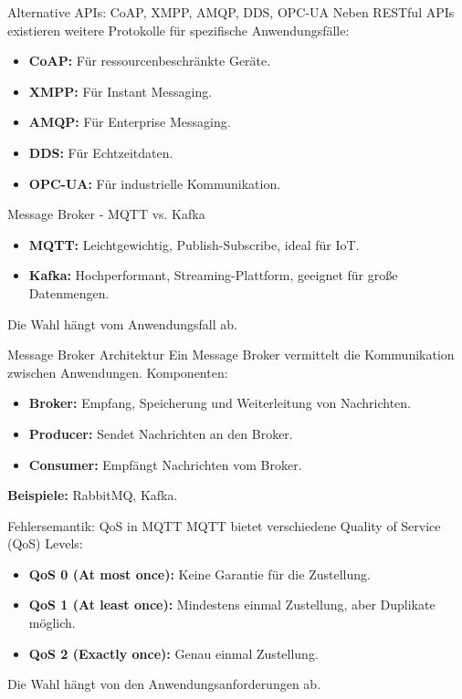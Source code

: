 \documentclass{beamer}
\begin{document}
\begin{frame}{Alternative APIs: CoAP, XMPP, AMQP, DDS, OPC-UA}
    Neben RESTful APIs existieren weitere Protokolle für spezifische Anwendungsfälle:
    \begin{itemize}
        \item \textbf{CoAP:} Für ressourcenbeschränkte Geräte.
        \item \textbf{XMPP:} Für Instant Messaging.
        \item \textbf{AMQP:} Für Enterprise Messaging.
        \item \textbf{DDS:} Für Echtzeitdaten.
        \item \textbf{OPC-UA:} Für industrielle Kommunikation.
    \end{itemize}
\end{frame}

\begin{frame}{Message Broker - MQTT vs. Kafka}
    \begin{itemize}
        \item \textbf{MQTT:} Leichtgewichtig, Publish-Subscribe, ideal für IoT.
        \item \textbf{Kafka:} Hochperformant, Streaming-Plattform, geeignet für große Datenmengen.
    \end{itemize}
    Die Wahl hängt vom Anwendungsfall ab.
\end{frame}

\begin{frame}{Message Broker Architektur}
    Ein Message Broker vermittelt die Kommunikation zwischen Anwendungen. Komponenten:
    \begin{itemize}
        \item \textbf{Broker:} Empfang, Speicherung und Weiterleitung von Nachrichten.
        \item \textbf{Producer:} Sendet Nachrichten an den Broker.
        \item \textbf{Consumer:} Empfängt Nachrichten vom Broker.
    \end{itemize}
    \textbf{Beispiele:} RabbitMQ, Kafka.
\end{frame}

\begin{frame}{Fehlersemantik: QoS in MQTT}
    MQTT bietet verschiedene Quality of Service (QoS) Levels:
    \begin{itemize}
        \item \textbf{QoS 0 (At most once):} Keine Garantie für die Zustellung.
        \item \textbf{QoS 1 (At least once):} Mindestens einmal Zustellung, aber Duplikate möglich.
        \item \textbf{QoS 2 (Exactly once):} Genau einmal Zustellung.
    \end{itemize}
    Die Wahl hängt von den Anwendungsanforderungen ab.
\end{frame}
\end{document}
